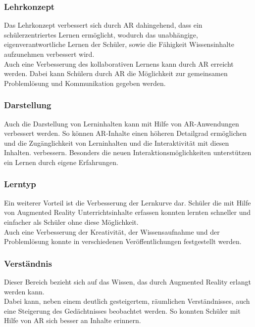 \subsubsection{Lehrkonzept}
Das Lehrkonzept verbessert sich durch AR  dahingehend, dass ein schülerzentriertes Lernen ermöglicht, wodurch das unabhängige, eigenverantwortliche Lernen der Schüler, sowie die Fähigkeit Wissensinhalte aufzunehmen verbessert wird.\\
Auch eine Verbesserung des kollaborativen Lernens kann durch AR erreicht werden. Dabei kann Schülern durch AR die Möglichkeit zur gemeinsamen Problemlösung und Kommunikation gegeben werden.
\citep[Kapitel 4.2]{diegmann:benefits-ar}

\subsubsection{Darstellung}
Auch die Darstellung von Lerninhalten kann mit Hilfe von AR-Anwendungen verbessert werden. So können AR-Inhalte einen höheren Detailgrad ermöglichen und die Zugänglichkeit von Lerninhalten und die Interaktivität mit diesen Inhalten. verbessern. Besonders die neuen Interaktionsmöglichkeiten unterstützen ein Lernen durch eigene Erfahrungen.
\citep[Kapitel 4.3]{diegmann:benefits-ar}

\subsubsection{Lerntyp}
Ein weiterer Vorteil ist die Verbesserung der Lernkurve dar. Schüler die mit Hilfe von Augmented Reality Unterrichtsinhalte erfassen konnten lernten schneller und einfacher als Schüler ohne diese Möglichkeit.\\
Auch eine Verbesserung der Kreativität, der Wissensaufnahme und der Problemlösung konnte in verschiedenen Veröffentlichungen festgestellt werden.
\citep[Kapitel 4.4]{diegmann:benefits-ar}

\subsubsection{Verständnis}
Dieser Bereich bezieht sich auf das Wissen, das durch Augmented Reality erlangt werden kann.\\
Dabei kann, neben einem deutlich gesteigertem, räumlichen Verständnisses, auch eine Steigerung des Gedächtnisses beobachtet werden. So konnten Schüler mit Hilfe von AR sich besser an Inhalte erinnern. \\
\citep[Kapitel 4.5]{diegmann:benefits-ar}

